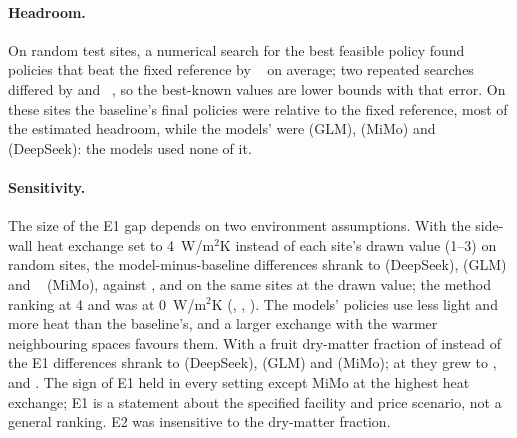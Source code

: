 \paragraph{Headroom.} On  random test sites, a numerical search for the best feasible policy found policies that beat the fixed reference by ~\eur{} on average; two repeated searches differed by  and ~\eur{}, so the best-known values are lower bounds with that error. On these sites the baseline's final policies were  relative to the fixed reference, most of the estimated headroom, while the models' were  (GLM),  (MiMo) and  (DeepSeek): the models used none of it.

\paragraph{Sensitivity.} The size of the E1 gap depends on two environment assumptions. With the side-wall heat exchange set to 4~W/m$^2$K instead of each site's drawn value (1--3) on  random sites, the model-minus-baseline differences shrank to  (DeepSeek),  (GLM) and ~\eur{} (MiMo), against ,  and  on the same sites at the drawn value; the method ranking  at 4 and was  at 0~W/m$^2$K (, , ). The models' policies use less light and more heat than the baseline's, and a larger exchange with the warmer neighbouring spaces favours them. With a fruit dry-matter fraction of  instead of  the E1 differences shrank to  (DeepSeek),  (GLM) and  (MiMo); at  they grew to ,  and . The sign of E1 held in every setting except MiMo at the highest heat exchange; E1 is a statement about the specified facility and price scenario, not a general ranking. E2 was insensitive to the dry-matter fraction.
